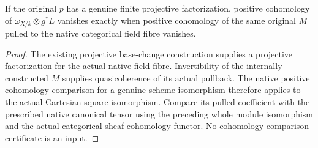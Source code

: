 \begin{lemma}
\label{lem:kn-arithmetic-canonical-square-cohomology}
\leanok
{}
If the original $p$ has a genuine finite projective factorization, positive
cohomology of $\omega_{X/k}\otimes g^*L$ vanishes exactly when positive
cohomology of the same original $M$ pulled to the native categorical field
fibre vanishes.
\end{lemma}
\begin{proof}
The existing projective base-change construction supplies a projective
factorization for the actual native field fibre.  Invertibility of the
internally constructed $M$ supplies quasicoherence of its actual pullback.
The native positive cohomology comparison for a genuine scheme isomorphism
therefore applies to the actual Cartesian-square isomorphism.  Compare its
pulled coefficient with the prescribed native canonical tensor using the
preceding whole module isomorphism and the actual categorical sheaf
cohomology functor.  No cohomology comparison certificate is an input.
\end{proof}

